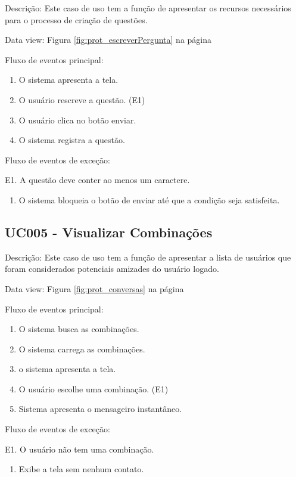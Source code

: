 Descrição: Este caso de uso tem a função de apresentar os recursos necessários para o processo de criação de questões.

Data view: Figura \ref{fig:prot_escreverPergunta} na página \pageref{fig:prot_escreverPergunta}

Fluxo de eventos principal:
\begin{enumerate}
\item O sistema apresenta a tela.
\item O usuário rescreve a questão. (E1)
\item O usuário clica no botão enviar.
\item O sistema registra a questão.
\end{enumerate}

Fluxo de eventos de exceção:

E1. A questão deve conter ao menos um caractere.

\begin{enumerate}
\item O sistema bloqueia o botão de enviar até que a condição seja satisfeita.
\end{enumerate}

\subsection*{UC005 - Visualizar Combinações}

Descrição: Este caso de uso tem a função de apresentar a lista de usuários que foram considerados potenciais amizades do usuário logado.

Data view: Figura \ref{fig:prot_conversas} na página \pageref{fig:prot_conversas}

Fluxo de eventos principal:
\begin{enumerate}
\item O sistema busca as combinações.
\item O sistema carrega as combinações.
\item o sistema apresenta a tela.
\item O usuário escolhe uma combinação. (E1)
\item Sistema apresenta o mensageiro instantâneo.
\end{enumerate}

Fluxo de eventos de exceção:

E1. O usuário não tem uma combinação.

\begin{enumerate}
\item Exibe a tela sem nenhum contato.
\end{enumerate}




